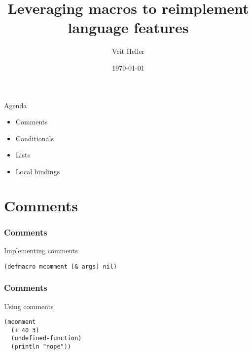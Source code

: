 \documentclass[aspectratio=169]{beamer}
\title{Leveraging macros to reimplement language features}
\date{\today}
\author{Veit Heller}
\institute{Clojure Meetup Berlin}
\begin{document}
  \maketitle
  \begin{frame}{Agenda}
    \begin{itemize}
      \item Comments
      \item Conditionals
      \item Lists
      \item Local bindings
    \end{itemize}
  \end{frame}
  \section{Comments}
  \begin{frame}[fragile]
    \frametitle{Comments}
    \begin{listing}[H]
      \caption{Implementing comments}
      \begin{verbatim}
(defmacro mcomment [& args] nil)
      \end{verbatim}
    \end{listing}
  \end{frame}
  \begin{frame}[fragile]
    \frametitle{Comments}
    \begin{listing}[H]
      \caption{Using comments}
      \begin{verbatim}
(mcomment
  (+ 40 3)
  (undefined-function)
  (println "nope"))
      \end{verbatim}
    \end{listing}
  \end{frame}
\end{document}
